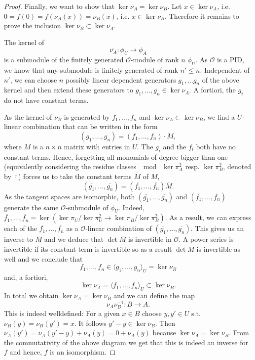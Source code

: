 \documentclass{article}
\theoremstyle{plain}%
\theoremstyle{definition}
\theoremstyle{remark}
\begin{document}
\begin{proof}
    Finally, we want to show that \(\ker \nu_A = \ker \nu_B\).
    Let \(x \in \ker \nu_A\), i.e. \(0 = f(0) = f(\nu_A(x)) = \nu_B(x)\), i.e. \(x \in \ker \nu_B\).
    Therefore it remains to prove the inclusion \(\ker \nu_B \subset \ker \nu_A\).
    
    The kernel of
    \[
        \overline{\nu_A} \colon \phi_U \to \phi_A  
    \]
    is a submodule of the finitely generated \(\mathcal{O}\)-module of rank \(n\) \(\phi_U\).
    As \(\mathcal{O}\) is a PID, we know that any submodule is finitely generated of rank \(n' \leq n\).
    Independent of \(n'\), we can choose \(n\) possibly linear dependent generators 
    \(\overline{g_1}, \dots \overline{g_n}\) of the above kernel and then extend these generators to 
    \(g_1, \dots, g_n \in \ker \nu_A\). A fortiori, the \(g_i\) do not have constant terms.

    As the kernel of \(\nu_B\) is generated by \(f_1, \dots, f_n\) and \(\ker \nu_A \subset \ker \nu_B\),
    we find a \(U\)-linear combination that can be written in the form
    \[
        (g_1, \dots, g_n) = (f_1, \dots, f_n) \cdot M,
    \]
    where \(M\) is a \(n \times n\) matrix with entries in \(U\).
    The \(g_i\) and the \(f_i\) both have no constant terms. Hence, forgetting all monomials 
    of degree bigger than one (equivalently considering the residue classes \(\mod\;\ker \pi_A^2\) 
    resp. \(\ker \pi_B^2\), denoted by \(\overline{\cdot}\)) forces us to take the constant terms \(\overline{M}\) of \(M\),
    \[
        (\overline{g_1}, \dots, \overline{g_n}) = (\overline{f_1}, \dots, \overline{f_n})\overline{M}.
    \]
    As the tangent spaces are isomorphic, both \((\overline{g_1}, \dots, \overline{g_n})\) and 
    \((\overline{f_1}, \dots, \overline{f_n})\) generate the same \(\mathcal{O}\)-submodule of
    \(\phi_U\).
    Indeed, 
    \(\overline{f_1}, \dots, \overline{f_n} = \ker( \ker \pi_U/\ker \pi_U^2 \to \ker \pi_B/\ker \pi_B^2)\).
    As a result, we can express each of the \(\overline{f_1}, \dots, \overline{f_n}\) as a 
    \(\mathcal{O}\)-linear combination of \((\overline{g_1}, \dots, \overline{g_n})\).
    This gives us an inverse to \(\overline{M}\) and we deduce that \(\det \overline{M}\) is invertible
    in \(\mathcal{O}\).
    A power series is invertible if its constant term is invertible so as a result \(\det M\) is invertible
    as well and we conclude that 
    \[ 
        f_1, \dots, f_n \in \langle g_1, \dots, g_n\rangle_U = \ker \nu_B
    \]
    and, a fortiori, 
    \[
        \ker \nu_A = \langle f_1, \dots, f_n\rangle_U \subset \ker \nu_B.
    \]
    In total we obtain \(\ker \nu_A = \ker \nu_B\) and we can define the map 
    \[
        \nu_A\nu_B^{-1}\colon B \to A.  
    \]
    This is indeed welldefined: For a given \(x \in B\) choose \(y, y' \in U\) s.t. 
    \(\nu_B(y) = \nu_B(y') = x\). It follows \(y' - y \in \ker \nu_B\). 
    Then \(\nu_A(y') = \nu_A(y'-y) + \nu_A(y) = 0 + \nu_A(y)\) because \(\ker \nu_A = \ker \nu_B\).
    From the commutativity of the above diagram we get that this is indeed an inverse for \(f\) and
    hence, \(f\) is an isomorphism.
\end{proof}
\end{document}
